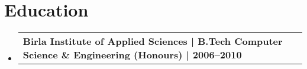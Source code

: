 \documentclass[letterpaper,10pt]{article}
\makeatletter
\newcommand{\subheadingtitlevspace}{\vspace{-3pt}}
\newcommand{\titleItem}[1]{\textbf{#1}}
\newcommand{\resumeProjectHeading}[2]{\item\begin{tabular*}{0.97\textwidth}{l@{\extracolsep{\fill}}r}#1 & \textit{ #2} \\\end{tabular*}\vspace{-9pt}}
\newcommand{\resumeSubHeadingListStart}{\subheadingtitlevspace\begin{itemize}[leftmargin=0.15in, label={}]}
\newcommand{\resumeSubHeadingListEnd}{\end{itemize}}
\makeatother
\begin{document}
\section{Education}
\resumeSubHeadingListStart
\resumeProjectHeading{\titleItem{Birla Institute of Applied Sciences | B.Tech Computer Science \& Engineering (Honours) | 2006--2010}}{}
\resumeSubHeadingListEnd
\end{document}
